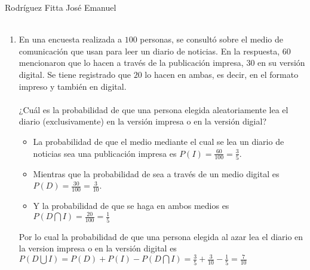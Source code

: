 \documentclass{article}
\begin{document}
Rodr\'iguez Fitta Jos\'e Emanuel \\ \\
\begin{enumerate}
\item En una encuesta realizada a $100$ personas, se consult\'o sobre el medio de comunicaci\'on que usan para leer un diario de noticias. En la respuesta, $60$ mencionaron que lo hacen a trav\'es de la publicaci\'on impresa, $30$ en su versi\'on digital. Se tiene registrado que $20$ lo hacen en ambas, es decir, en el formato impreso y tambi\'en en digital. \\  \\ ¿Cu\'al es la probabilidad de que una persona elegida aleatoriamente lea el diario (exclusivamente) en la versi\'on impresa o en la versi\'on digial?
\begin{itemize}
\item La probabilidad de que el medio mediante el cual se lea un diario de noticias sea una publicaci\'on impresa es $P(I) = \frac{60}{100} = \frac{3}{5}$. 
\item Mientras que la probabilidad de sea a trav\'es de un medio digital es $P(D) = \frac{30}{100} = \frac{3}{10}$.
\item Y la probabilidad de que se haga en ambos medios es $ P(D\bigcap I ) = \frac{20}{100} = \frac{1}{5}$
\end{itemize}
Por lo cual la probabilidad de que una persona elegida al azar lea el diario en la version impresa o en la versi\'on digital es \\ $P(D\bigcup I ) = P(D) + P(I) - P(D \bigcap I) = \frac{3}{5} + \frac{3}{10} - \frac{1}{5} = \frac{7}{10}$


\end{enumerate}
\end{document}

